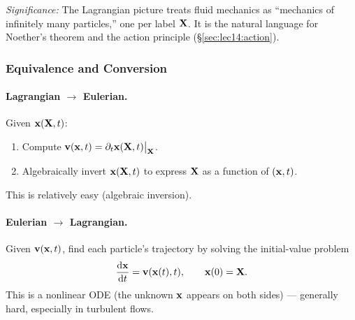 \documentclass[../main.tex]{subfiles}
\begin{document}
\textit{Significance:} The Lagrangian picture treats fluid mechanics as ``mechanics of infinitely many particles,'' one per label $\mathbf{X}$. It is the natural language for Noether's theorem and the action principle (\S\ref{sec:lec14:action}).

\subsubsection{Equivalence and Conversion}

\paragraph{Lagrangian $\to$ Eulerian.}
Given $\mathbf{x}(\mathbf{X},t)$:
\begin{enumerate}
  \item Compute $\mathbf{v}(\mathbf{x},t) = \partial_t\mathbf{x}(\mathbf{X},t)\big|_{\mathbf{X}}$.
  \item Algebraically invert $\mathbf{x}(\mathbf{X},t)$ to express $\mathbf{X}$ as a function of $(\mathbf{x},t)$.
\end{enumerate}
This is relatively easy (algebraic inversion).

\paragraph{Eulerian $\to$ Lagrangian.}
Given $\mathbf{v}(\mathbf{x},t)$, find each particle's trajectory by solving the initial-value problem
\begin{equation}
  \dv{\mathbf{x}}{t} = \mathbf{v}(\mathbf{x}(t),t), \qquad \mathbf{x}(0) = \mathbf{X}.
  \label{eq:lec14_pathline_ode}
\end{equation}
This is a nonlinear ODE (the unknown $\mathbf{x}$ appears on both sides) — generally hard, especially in turbulent flows.
\end{document}
